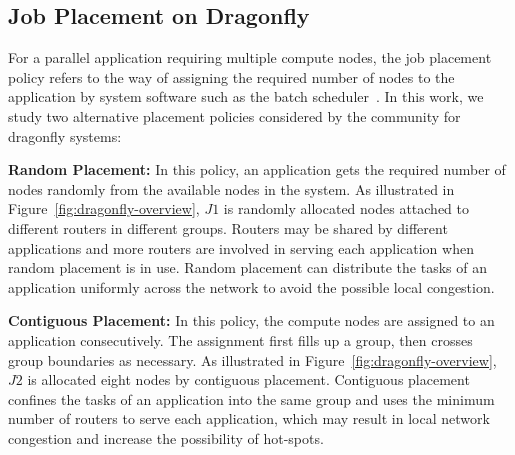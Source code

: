 \subsection{Job Placement on Dragonfly}
\label{sec:placement-schemes}

For a parallel application requiring multiple compute nodes, the job placement policy refers to the way of assigning the required number of nodes to the application by system software such as the batch scheduler~\cite{tsafrir-tpds-2007}. In this work, we study two alternative placement policies considered by the community for dragonfly systems: 

\textbf{Random Placement:} In this policy, an application gets the required number of nodes randomly from the available nodes in the system. As illustrated in Figure~\ref{fig:dragonfly-overview}, $J1$ is randomly allocated nodes attached to different routers in different groups. Routers may be shared by different applications and more routers are involved in serving each application when random placement is in use. Random placement can distribute the tasks of an application uniformly across the network to avoid the possible local congestion. 



\textbf{Contiguous Placement:} In this policy, the compute nodes are assigned to an application consecutively. The assignment first fills up a group, then crosses group boundaries as necessary. As illustrated in Figure~\ref{fig:dragonfly-overview}, $J2$ is allocated eight nodes by contiguous placement. Contiguous placement confines the tasks of an application into the same group and uses the minimum number of routers to serve each application, which may result in local network congestion and increase the possibility of hot-spots. 
